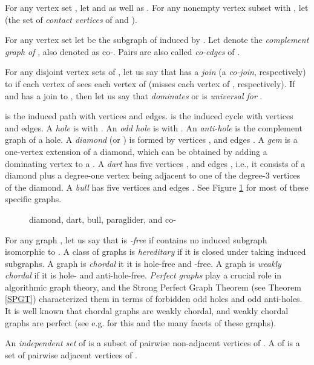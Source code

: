 \documentclass[11pt]{article}
\newcommand{\0}{\text{ has a co-join to }}
\newcommand{\1}{\text{ has a join to }}
\begin{document}
For any vertex set , let  and  as well as .
For any nonempty vertex subset  with , let  (the set of {\em contact vertices} of  and ).

For any vertex set  let  be the subgraph of  induced by . Let  denote the {\em complement graph of }, also denoted as co-. Pairs  are also called {\em co-edges} of . 

For any disjoint vertex sets  of , let us say that  has a {\em join} (a {\em co-join}, respectively) to  if each vertex of  sees each vertex of  (misses each vertex of , respectively). If  and  has a join to , then let us say that  {\em dominates}  or is {\em universal for }.

 is the induced path with  vertices and  edges.  is the induced cycle with  vertices and  edges. A {\em hole} is  with . An 
{\em odd hole} is  with . An {\em anti-hole} is the complement graph of a hole. 
A {\em diamond} (or ) is formed by vertices , and edges . A {\em gem} is a one-vertex extension of a diamond, which can be obtained by adding  a dominating vertex to a .
A {\em dart} has five vertices , and edges , i.e., it consists of a diamond plus a degree-one vertex being adjacent to one of the degree-3 vertices of the diamond. A {\em bull} has five vertices  and edges . See Figure \ref{dart} for most of these specific graphs. 

\begin{figure}
  \begin{center}
    \caption{diamond, dart, bull, paraglider, and co-}
    \label{dart}
  \end{center}
\end{figure}

For any graph , let us say that  is {\em -free} if  contains no induced subgraph isomorphic to . A class of graphs is {\em hereditary} if it is closed under taking induced subgraphs. A graph is {\em chordal} it it is hole-free and -free. A graph is {\em weakly chordal} if it is hole- and anti-hole-free.
{\em Perfect graphs} play a crucial role in algorithmic graph theory, and the Strong Perfect Graph Theorem (see Theorem \ref{SPGT}) characterized them in terms of forbidden odd holes and odd anti-holes. It is well known that chordal graphs are weakly chordal, and weakly chordal graphs are perfect (see e.g. \cite{BraLeSpi1999} for this and the many facets of these graphs). 

An {\em independent set} of  is a subset of pairwise non-adjacent vertices of . A  of  is a set of pairwise adjacent vertices of .
\end{document}
